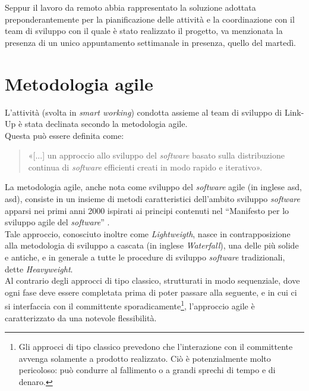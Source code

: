 Seppur il lavoro da remoto abbia rappresentato la soluzione adottata preponderantemente per la pianificazione delle attività e la coordinazione con il team di sviluppo con il quale è stato realizzato il progetto, va menzionata la presenza di un unico appuntamento settimanale in presenza, quello del martedì.

\section{Metodologia agile}
\label{sec:Metodologia agile}
L'attività (svolta in \textit{smart working}) condotta assieme al team di sviluppo di Link-Up è stata declinata secondo la metodologia agile.\\
Questa può essere definita come:
\begin{quote}
  «[...] un approccio allo sviluppo del \textit{software} basato sulla distribuzione continua di \textit{software} efficienti creati in modo rapido e iterativo»\cite{RedHat_MetodologiaAgile}.
\end{quote}

La metodologia agile, anche nota come sviluppo del \textit{software} agile (in inglese \acrlong{asd}, \acrshort{asd}), consiste in un insieme di metodi caratteristici dell'ambito sviluppo \textit{software} apparsi nei primi anni 2000 ispirati ai principi contenuti nel “Manifesto per lo sviluppo agile del \textit{software}” \cite{BeckEtAl_ManifestoSviluppoAgileSoftware}.\\
Tale approccio, conosciuto inoltre come \textit{Lightweigth}, nasce in contrapposizione alla metodologia di sviluppo a cascata (in inglese \textit{Waterfall}), una delle più solide e antiche, e in generale a tutte le procedure di sviluppo \textit{software} tradizionali, dette \textit{Heavyweight}.\\
Al contrario degli approcci di tipo classico, strutturati in modo sequenziale, dove ogni fase deve essere completata prima di poter passare alla seguente, e in cui ci si interfaccia con il committente sporadicamente\footnote{Gli approcci di tipo classico prevedono che l'interazione con il committente avvenga solamente a prodotto realizzato. Ciò è potenzialmente molto pericoloso: può condurre al fallimento o a grandi sprechi di tempo e di denaro.}, l'approccio agile è caratterizzato da una notevole flessibilità.

